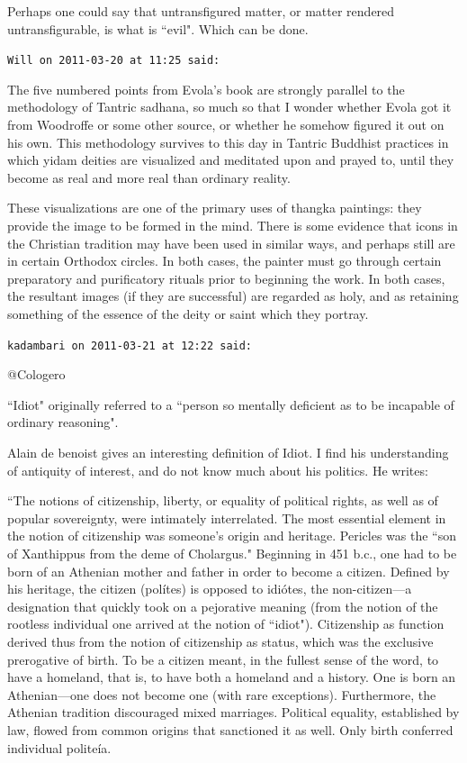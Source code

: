 \begin{footnotesize}
\begin{sffamily}
Perhaps one could say that untransfigured matter, or matter rendered untransfigurable, is what is ``evil". Which can be done.


\hfill

\texttt{Will on 2011-03-20 at 11:25 said: }

The five numbered points from Evola's book are strongly parallel to the methodology of Tantric sadhana, so much so that I wonder whether Evola got it from Woodroffe or some other source, or whether he somehow figured it out on his own. This methodology survives to this day in Tantric Buddhist practices in which yidam deities are visualized and meditated upon and prayed to, until they become as real and more real than ordinary reality.

These visualizations are one of the primary uses of thangka paintings: they provide the image to be formed in the mind. There is some evidence that icons in the Christian tradition may have been used in similar ways, and perhaps still are in certain Orthodox circles. In both cases, the painter must go through certain preparatory and purificatory rituals prior to beginning the work. In both cases, the resultant images (if they are successful) are regarded as holy, and as retaining something of the essence of the deity or saint which they portray.


\hfill

\texttt{kadambari on 2011-03-21 at 12:22 said: }

@Cologero

``Idiot" originally referred to a ``person so mentally deficient as to be incapable of ordinary reasoning".

Alain de benoist gives an interesting definition of Idiot. I find his understanding of antiquity of interest, and do not know much about his politics. He writes:

``The notions of citizenship, liberty, or equality of political rights, as well as of popular sovereignty, were intimately interrelated. The most essential element in the notion of citizenship was someone's origin and heritage. Pericles was the ``son of Xanthippus from the deme of Cholargus." Beginning in 451 b.c., one had to be born of an Athenian mother and father in order to become a citizen. Defined by his heritage, the citizen (polítes) is opposed to idiótes, the non-citizen—a designation that quickly took on a pejorative meaning (from the notion of the rootless individual one arrived at the notion of ``idiot"). Citizenship as function derived thus from the notion of citizenship as status, which was the exclusive prerogative of birth. To be a citizen meant, in the fullest sense of the word, to have a homeland, that is, to have both a homeland and a history. One is born an Athenian—one does not become one (with rare exceptions). Furthermore, the Athenian tradition discouraged mixed marriages. Political equality, established by law, flowed from common origins that sanctioned it as well. Only birth conferred individual politeía.


\end{sffamily}
\end{footnotesize}
